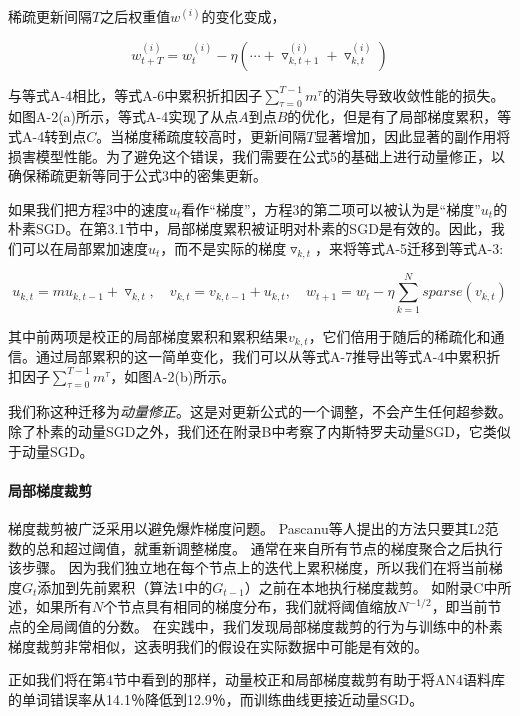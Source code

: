 稀疏更新间隔$T$之后权重值$w^{(i)}$的变化变成，

\begin{equation}
	\label{eq:nomc_change}
	w_{t+T}^{(i)} = w_{t}^{(i)} - \eta \left(\cdots + \triangledown^{(i)}_{k,t+1} + \triangledown^{(i)}_{k,t}\right)
\end{equation}

与等式A-4相比，等式A-6中累积折扣因子$\sum_{\tau=0}^{T-1} m^{\tau}$的消失导致收敛性能的损失。如图A-2(a)所示，等式A-4实现了从点$A$到点$B$的优化，但是有了局部梯度累积，等式A-4转到点$C$。当梯度稀疏度较高时，更新间隔$T$显著增加，因此显著的副作用将损害模型性能。为了避免这个错误，我们需要在公式5的基础上进行动量修正，以确保稀疏更新等同于公式3中的密集更新。

如果我们把方程3中的速度$u_t$看作“梯度”，方程3的第二项可以被认为是“梯度”$u_t$的朴素SGD。在第3.1节中，局部梯度累积被证明对朴素的SGD是有效的。因此，我们可以在局部累加速度$u_t$，而不是实际的梯度$\triangledown_{k,t}$，来将等式A-5迁移到等式A-3:

\begin{equation}
	\label{eq:mc}
	u_{k,t} = mu_{k,t-1} + \triangledown_{k,t},\quad  v_{k,t} = v_{k,t-1} + u_{k,t},\quad   w_{t+1} = w_{t} - \eta \sum_{k=1}^{N} sparse\left( v_{k,t}\right) 
\end{equation}

其中前两项是校正的局部梯度累积和累积结果$v_{k,t}$，它们倍用于随后的稀疏化和通信。通过局部累积的这一简单变化，我们可以从等式A-7推导出等式A-4中累积折扣因子$\sum_{\tau=0}^{T-1} m^{\tau}$，如图A-2(b)所示。

我们称这种迁移为\emph{动量修正}。这是对更新公式的一个调整，不会产生任何超参数。除了朴素的动量SGD之外，我们还在附录B中考察了内斯特罗夫动量SGD，它类似于动量SGD。

\paragraph{局部梯度裁剪}
梯度裁剪被广泛采用以避免爆炸梯度问题。 Pascanu等人提出的方法只要其L2范数的总和超过阈值，就重新调整梯度。 通常在来自所有节点的梯度聚合之后执行该步骤。 因为我们独立地在每个节点上的迭代上累积梯度，所以我们在将当前梯度$G_t$添加到先前累积（算法1中的$G_{t-1}$）之前在本地执行梯度裁剪。 如附录C中所述，如果所有$N$个节点具有相同的梯度分布，我们就将阈值缩放$N^{-1/2}$，即当前节点的全局阈值的分数。 在实践中，我们发现局部梯度裁剪的行为与训练中的朴素梯度裁剪非常相似，这表明我们的假设在实际数据中可能是有效的。

正如我们将在第4节中看到的那样，动量校正和局部梯度裁剪有助于将AN4语料库的单词错误率从14.1％降低到12.9％，而训练曲线更接近动量SGD。

